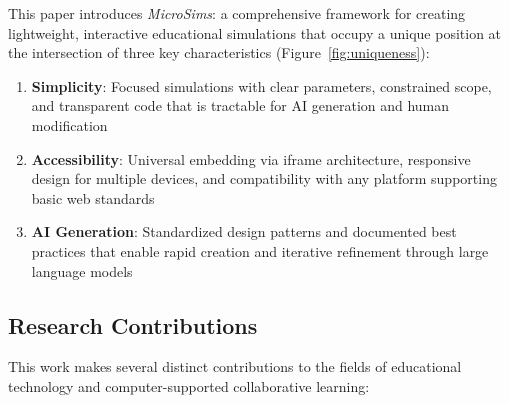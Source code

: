 This paper introduces \textit{MicroSims}: a comprehensive framework for creating lightweight, interactive educational simulations that occupy a unique position at the intersection of three key characteristics (Figure~\ref{fig:uniqueness}):

\begin{enumerate}
\item \textbf{Simplicity}: Focused simulations with clear parameters, constrained scope, and transparent code that is tractable for AI generation and human modification
\item \textbf{Accessibility}: Universal embedding via iframe architecture, responsive design for multiple devices, and compatibility with any platform supporting basic web standards
\item \textbf{AI Generation}: Standardized design patterns and documented best practices that enable rapid creation and iterative refinement through large language models
\end{enumerate}

\subsection{Research Contributions}

This work makes several distinct contributions to the fields of educational technology and computer-supported collaborative learning:

